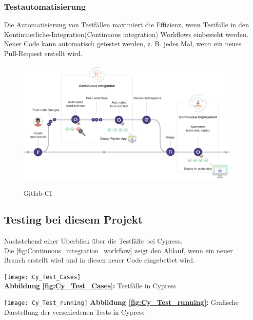 \subsubsection*{Testautomatisierung}
Die Automatisierung von Testfällen maximiert die Effizienz, wenn Testfälle in den Kontinuierliche-Integration(Continuous integration) Workflows einbezieht werden. Neuer Code kann automatisch getestet werden, z. B. jedes Mal, wenn ein neues Pull-Request erstellt wird.

\begin{figure}[ht]
	\centering
    \includegraphics[width=\textwidth]{sources/Gitlab-CI.png}\cite{MG10}
	\caption{Gitlab-CI}
	\label{fig:Continuous_integration_workflow } {\cite{GLAB1}}
\end{figure}


\subsection*{Testing bei diesem Projekt}
\paragraph{}
Nachstehend einer Überblick über die Testfälle bei Cypress.
\\
Die \autoref{fig:Continuous_integration_workflow} zeigt den Ablauf, wenn ein neuer Branch erstellt wird und in diesen neuer Code eingebettet wird.
\begin{center}
\texttt{[image: Cy\_Test\_Cases]}
\label{fig:Cy_Test_Cases}\\
\textbf{Abbildung \autoref{fig:Cy_Test_Cases}:} Testfälle in Cypress
\end{center}

\begin{center}
\texttt{[image: Cy\_Test\_running]}\label{fig:Cy_Test_running}
\textbf{Abbildung \autoref{fig:Cy_Test_running}:} Grafische Darstellung der verschiedenen Tests in Cypress
\end{center}


